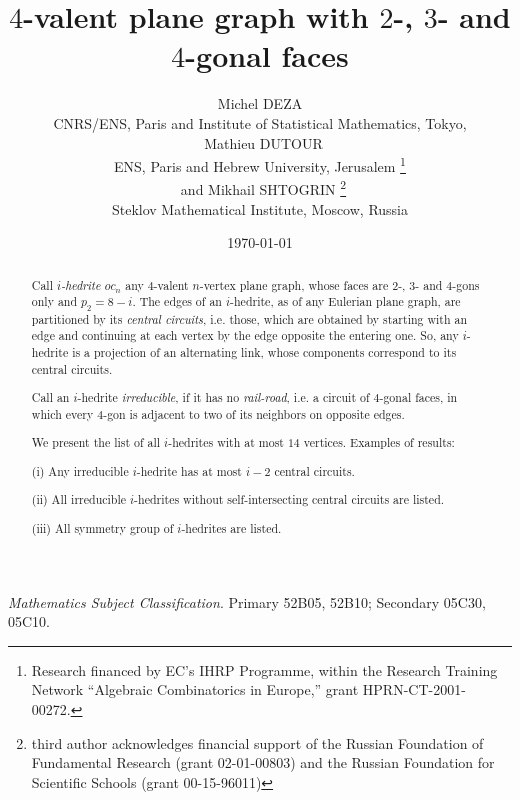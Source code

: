 \documentclass[12pt]{article}
\begin{document}
\title{$4$-valent plane graph with $2$-, $3$- and $4$-gonal faces}


\author{Michel DEZA \\
  CNRS/ENS, Paris and Institute of Statistical Mathematics, 
Tokyo,\\
\ Mathieu DUTOUR \\
 ENS, Paris and Hebrew University, Jerusalem
\footnote{Research financed by EC's IHRP Programme, within the Research Training Network ``Algebraic Combinatorics in Europe,'' grant HPRN-CT-2001-00272.}\\
\ and  Mikhail SHTOGRIN \thanks{third author acknowledges financial support 
of the Russian Foundation of Fundamental Research (grant 02-01-00803)
and the Russian Foundation for Scientific Schools (grant 00-15-96011)}\\
Steklov Mathematical Institute, Moscow, Russia} 
\date{\today}

\maketitle



\begin{abstract}
Call {\em $i$-hedrite $oc_n$} any $4$-valent $n$-vertex plane graph, whose 
faces are $2$-, $3$- and $4$-gons only and $p_2=8-i$. The edges of an $i$-hedrite, as of 
any Eulerian plane graph, are partitioned
by its {\em central circuits}, i.e. those, which are obtained by starting with an
edge and continuing at each vertex by the edge opposite the entering one. 
So, any $i$-hedrite is a projection of an alternating link, whose components
correspond to its central circuits.

Call an $i$-hedrite {\em irreducible}, if it has no 
{\em rail-road}, i.e. a 
circuit of $4$-gonal faces, in which every $4$-gon is adjacent to two of its 
neighbors on opposite edges.

We present the list of all $i$-hedrites with at most $14$ vertices. Examples of results: 

(i) Any irreducible $i$-hedrite has at most $i-2$ central circuits.

(ii) All irreducible $i$-hedrites without self-intersecting central circuits are listed.

(iii) All symmetry group of $i$-hedrites are listed.

\end{abstract}

{\em Mathematics Subject Classification}. Primary 52B05, 52B10;
Secondary 05C30, 05C10.
\end{document}
